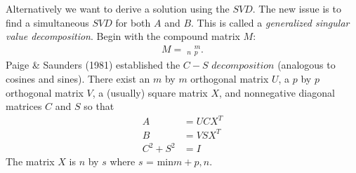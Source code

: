 Alternatively we want to derive a solution using the $SVD$. The new issue is to find a simultaneous $SVD$ for both $A$ and $B$. This is called a \textit{generalized singular value decomposition}. Begin with the compound matrix $M$:
\begin{align*}
M = 
\mathop{\begin{bmatrix}
A\\
B
\end{bmatrix}}_{n}{}^{m}_{p}.
\end{align*}
Paige \& Saunders (1981) established the $C-S$ $\textit{decomposition}$ (analogous to cosines and sines).  There exist an $m$ by $m$ orthogonal matrix $U$, a $p$ by $p$ orthogonal matrix $V$, a (usually) square matrix $X$, and nonnegative diagonal matrices $C$ and $S$ so that
\begin{align}
A &= UCX^{T} \\
B &= VSX^{T} \\
C^{2}+S^{2} &= I
\end{align}
The matrix $ X$ is $n$ by $s$ where $s$ = min{$m+p, n$}.

